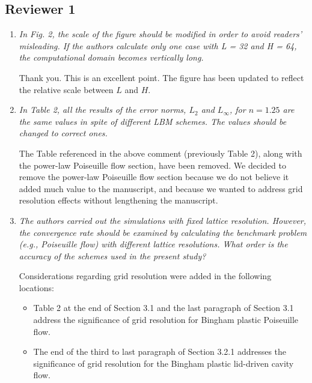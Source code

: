 \documentclass{article}
\begin{document}
  \subsection*{Reviewer 1}
	\begin{enumerate}
		\item \emph{In Fig. 2, the scale of the figure should be modified in order to avoid readers’ misleading. If the authors calculate only one case with L = 32 and H = 64, the computational domain becomes vertically long.}
		
		Thank you. This is an excellent point. The figure has been updated to reflect the relative scale between $L$ and $H$.
		
		\item \emph{In Table 2, all the results of the error norms, $L_{2}$ and $L_{\infty}$, for $n = 1.25$ are the same values in spite of different LBM schemes. The values should be changed to correct ones.}
		
		
		The Table referenced in the above comment (previously Table 2), along with the power-law Poiseuille flow section, have been removed. We decided to remove the power-law Poiseuille flow section because we do not believe it added much value to the manuscript, and because we wanted to address grid resolution effects without lengthening the manuscript.
		
		\item \emph{The authors carried out the simulations with fixed lattice resolution. However, the convergence rate should be examined by calculating the benchmark problem (e.g., Poiseuille flow) with different lattice resolutions. 
		What order is the accuracy of the schemes used in the present study?}
	
		Considerations regarding grid resolution were added in the following locations:
		\begin{itemize}
			\item Table 2 at the end of Section 3.1 and the last paragraph of Section 3.1 address the significance of grid resolution for Bingham plastic Poiseuille flow.
			\item The end of the third to last paragraph of Section 3.2.1 addresses the significance of grid resolution for the Bingham plastic lid-driven cavity flow.
		\end{itemize}
	

\end{enumerate}
\end{document}
